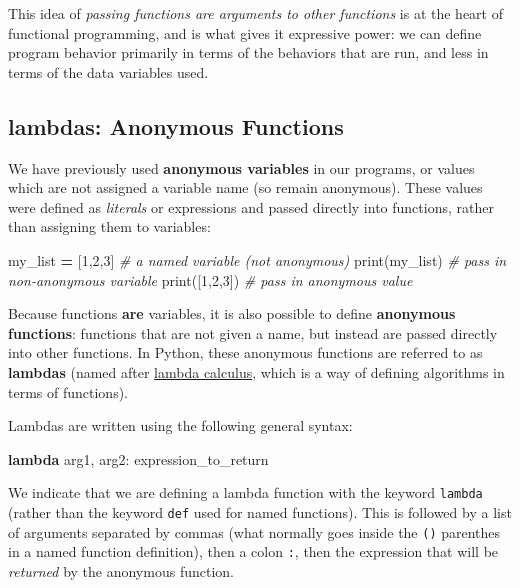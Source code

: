 \documentclass[]{book}
\newenvironment{Shaded}{\begin{snugshade}}{\end{snugshade}}
\newcommand{\KeywordTok}[1]{\textcolor[rgb]{0.13,0.29,0.53}{\textbf{#1}}}
\newcommand{\DecValTok}[1]{\textcolor[rgb]{0.00,0.00,0.81}{#1}}
\newcommand{\CommentTok}[1]{\textcolor[rgb]{0.56,0.35,0.01}{\textit{#1}}}
\newcommand{\OperatorTok}[1]{\textcolor[rgb]{0.81,0.36,0.00}{\textbf{#1}}}
\newcommand{\BuiltInTok}[1]{#1}
\newcommand{\NormalTok}[1]{#1}
\begin{document}
This idea of \emph{passing functions are arguments to other functions}
is at the heart of functional programming, and is what gives it
expressive power: we can define program behavior primarily in terms of
the behaviors that are run, and less in terms of the data variables
used.

\hypertarget{lambdas-anonymous-functions}{\subsection{lambdas: Anonymous
Functions}\label{lambdas-anonymous-functions}}

We have previously used \textbf{anonymous variables} in our programs, or
values which are not assigned a variable name (so remain anonymous).
These values were defined as \emph{literals} or expressions and passed
directly into functions, rather than assigning them to variables:

\begin{Shaded}
\begin{Highlighting}[]
\NormalTok{my_list }\OperatorTok{=}\NormalTok{ [}\DecValTok{1}\NormalTok{,}\DecValTok{2}\NormalTok{,}\DecValTok{3}\NormalTok{]  }\CommentTok{# a named variable (not anonymous)}
\BuiltInTok{print}\NormalTok{(my_list)  }\CommentTok{# pass in non-anonymous variable}
\BuiltInTok{print}\NormalTok{([}\DecValTok{1}\NormalTok{,}\DecValTok{2}\NormalTok{,}\DecValTok{3}\NormalTok{])  }\CommentTok{# pass in anonymous value}
\end{Highlighting}
\end{Shaded}

Because functions \textbf{are} variables, it is also possible to define
\textbf{anonymous functions}: functions that are not given a name, but
instead are passed directly into other functions. In Python, these
anonymous functions are referred to as \textbf{lambdas} (named after
\href{https://en.wikipedia.org/wiki/Lambda_calculus}{lambda calculus},
which is a way of defining algorithms in terms of functions).

Lambdas are written using the following general syntax:

\begin{Shaded}
\begin{Highlighting}[]
\KeywordTok{lambda}\NormalTok{ arg1, arg2: expression_to_return}
\end{Highlighting}
\end{Shaded}

We indicate that we are defining a lambda function with the keyword
\texttt{lambda} (rather than the keyword \texttt{def} used for named
functions). This is followed by a list of arguments separated by commas
(what normally goes inside the \texttt{()} parenthes in a named function
definition), then a colon \texttt{:}, then the expression that will be
\emph{returned} by the anonymous function.
\end{document}

